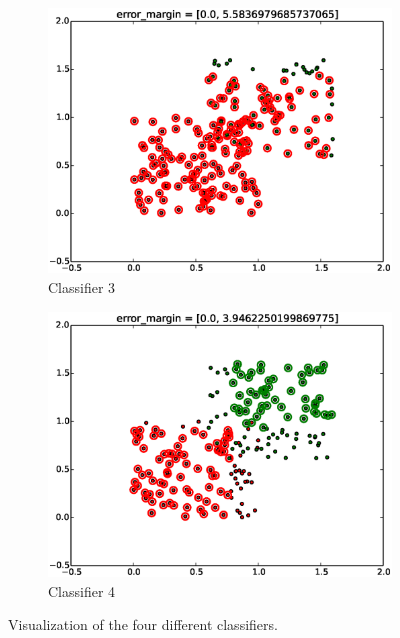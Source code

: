 \documentclass[a4paper,10pt]{article}
\begin{document}
\begin{figure}[ht!]
\begin{subfigure}{.49\textwidth}
    \includegraphics[width=1.00\textwidth]{svm3minError.eps}
    \caption{Classifier 3}
    \end{subfigure}
    \begin{subfigure}{.49\textwidth}
    \includegraphics[width=1.00\textwidth]{svm4minError.eps}
    \caption{Classifier 4}
    \end{subfigure}
    \caption{Visualization of the four different classifiers.}
    \label{fig:4classifiers}
\end{figure}
\end{document}
